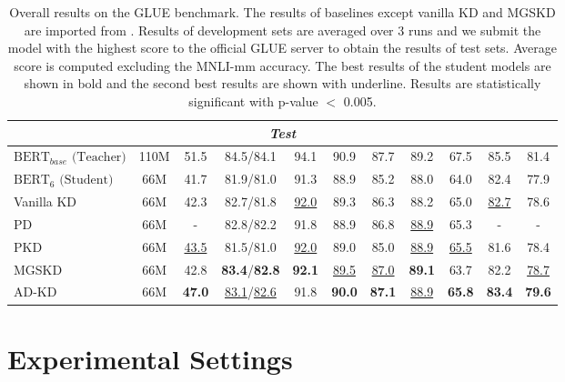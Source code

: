 \documentclass[11pt]{article}
\begin{document}
\begin{table}[t]
\begin{adjustbox}{width=0.78\width,center}
\begin{tabular}{l|c|cccccccc| >{\columncolor{mygray}} c}
            \hline
		\multicolumn{11}{c}{\textit{Test}}\\
            \hline
            $\text{BERT}_{base}\text{ (Teacher)}$ &110M &51.5 &84.5/84.1 &94.1 &90.9 &87.7 &89.2 &67.5 &85.5 &81.4 \\
            $\text{BERT}_{6}\text{ (Student)}$ &66M &41.7 &81.9/81.0 &91.3 &88.9 &85.2 &88.0 &64.0 &82.4 &77.9 \\
            \hline
            Vanilla KD \citep{hinton2015distilling} &66M &42.3 &82.7/81.8 &\underline{92.0} &89.3 &86.3 &88.2 &65.0 &\underline{82.7} &78.6 \\
		PD \citep{turc2019well} &66M &- &82.8/82.2 &91.8 &88.9 &86.8 &\underline{88.9} &65.3 &- &- \\
            PKD \citep{sun-etal-2019-patient} &66M &\underline{43.5} &81.5/81.0 &\underline{92.0} &89.0 &85.0 &\underline{88.9} &\underline{65.5} &81.6 &78.4 \\
            MGSKD \citep{liu-etal-2022-multi-granularity} &66M &42.8 &\textbf{83.4}/\textbf{82.8} &\textbf{92.1} &\underline{89.5} &\underline{87.0} &\textbf{89.1} &63.7 &82.2 &\underline{78.7} \\
            \rowcolor{mygray} AD-KD &66M &\textbf{47.0} &\underline{83.1}/\underline{82.6} &91.8 &\textbf{90.0} &\textbf{87.1} &\underline{88.9} &\textbf{65.8} &\textbf{83.4} &\textbf{79.6} \\
            \bottomrule
	\end{tabular}
        
        \end{adjustbox}
        \caption{Overall results on the GLUE benchmark. The results of baselines except vanilla KD and MGSKD are imported from \citet{park-etal-2021-distilling}. Results of development sets are averaged over 3 runs and we submit the model with the highest score to the official GLUE server to obtain the results of test sets. Average score is computed excluding the MNLI-mm accuracy. The best results of the student models are shown in bold and the second best results are shown with underline. Results are statistically significant with p-value $<$ 0.005.}	
	\label{tab:overall}
 
\end{table}
\section{Experimental Settings}
\end{document}
